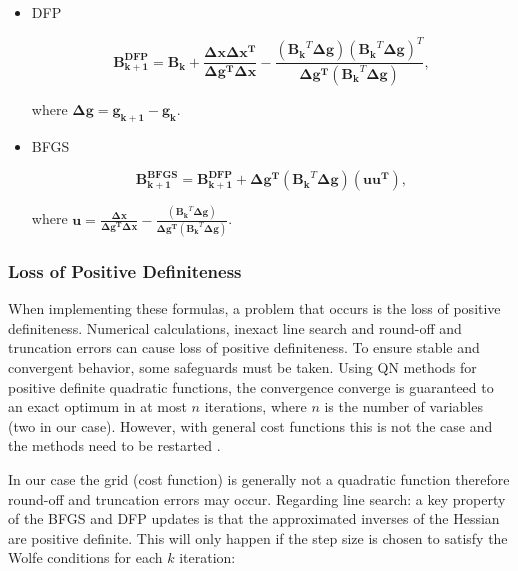 \begin{itemize}
	\item DFP
	
	\begin{equation}
	 \mathbf{B_{k+1}^{DFP}} =  \mathbf{B_k} + 	\frac{\mathbf{\Delta x}   \mathbf{\Delta x^{T}}}		
	 {\mathbf{\Delta g^{T}}  \mathbf{\Delta x}  } -  \frac{(\mathbf{B_{k}}^{T}  \mathbf{\Delta g}) (\mathbf{B_{k}}^{T}  \mathbf{\Delta g})^{T}  }
	 {\mathbf{\Delta g^{T}} (\mathbf{B_{k}}^{T}  \mathbf{\Delta g})   },
	 \label{eq:DFP}
	\end{equation}
	
	where $\mathbf{\Delta g} = \mathbf{g_{k+1} }- \mathbf{g_k} $.
	
	\item BFGS
	
	\begin{equation}
	\mathbf{B_{k+1}^{BFGS}} =  \mathbf{B_{k+1}^{DFP}} + \mathbf{\Delta g^{T}}(\mathbf{B_{k}}^{T}  \mathbf{\Delta g})(\mathbf{u}  \mathbf{u^{T}})	,
	\end{equation}	
	
	where $\mathbf{u} = \frac{\mathbf{\Delta x}}		
	{\mathbf{\Delta g^{T}}  \mathbf{\Delta x}} - \frac{(\mathbf{B_{k}}^{T}  \mathbf{\Delta g})   }
	{\mathbf{\Delta g^{T}} (\mathbf{B_{k}}^{T}  \mathbf{\Delta g})   }$.
	

\end{itemize}


\subsubsection{Loss of Positive Definiteness}
\label{subsubsec:loss_pdness}

When implementing these formulas, a problem that occurs is the loss of positive definiteness. Numerical calculations, inexact line search and round-off and truncation errors can cause loss of positive definiteness. To ensure stable and convergent behavior, some safeguards must be taken. 
Using QN methods for positive definite quadratic functions, the convergence converge is guaranteed to an exact optimum in at most $n$ iterations, where $n$ is the number of variables (two in our case).
However, with general cost functions this is not the case and the methods need to be restarted   \cite{intro_opt_design}.


In our case the grid (cost function) is generally not a quadratic function therefore round-off and truncation errors may occur. 
Regarding line search: a key property of the BFGS and DFP updates is that the approximated inverses of the Hessian are positive definite. This will only happen if the step size is chosen to satisfy the Wolfe conditions for each $k$ iteration:


